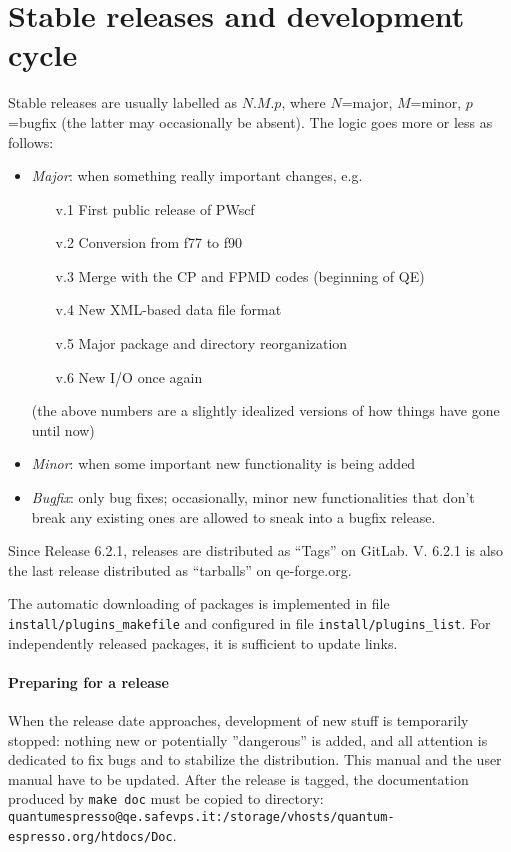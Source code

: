 \documentclass[12pt,a4paper]{article}
\def\qe{QE}
\begin{document}
\section{Stable releases and development cycle}
Stable releases are usually labelled as $N.M.p$, where $N$=major,
$M$=minor, $p$=bugfix (the latter may occasionally be absent).
The logic goes more or less as follows:
\begin{itemize}
\item {\em Major}: when something really important changes, e.g.
\begin{enumerate}
\item[v.1] First public release of PWscf
\item[v.2] Conversion from f77 to f90
\item[v.3] Merge with the CP and FPMD codes (beginning of \qe)
\item[v.4] New XML-based data file format
\item[v.5] Major package and directory reorganization
\item[v.6] New I/O once again
\end{enumerate}
(the above numbers are a slightly idealized versions of how things have
gone until now)
\item {\em Minor}: when some important new functionality is being added
\item {\em Bugfix}: only bug fixes; occasionally, minor new functionalities
that don't break any existing ones are allowed to sneak into a bugfix release.
\end{itemize}

Since Release 6.2.1, releases are distributed as ``Tags'' on GitLab.
V. 6.2.1 is also the last release distributed as ``tarballs'' on qe-forge.org.

The automatic downloading of packages is implemented in file
\texttt{install/plugins\_makefile} and configured in file
\texttt{install/plugins\_list}. For independently released packages,
it is sufficient to update links.

\paragraph{Preparing for a release}
When the release date approaches, development of new stuff is temporarily
stopped: nothing new or potentially ''dangerous'' is added, and all
attention is dedicated to fix bugs and to stabilize the distribution.
This manual and the user manual have to be updated. After the release
is tagged, the documentation produced by \texttt{make doc} must be copied
to directory:\\
\texttt{quantumespresso@qe.safevps.it:/storage/vhosts/quantum-espresso.org/htdocs/Doc}.
\end{document}

